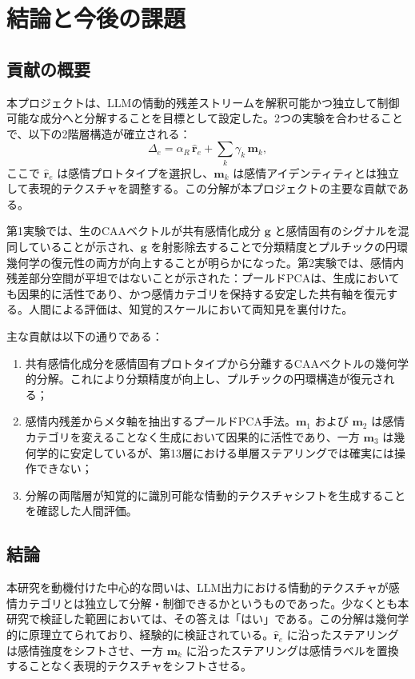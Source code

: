 \chapter{結論と今後の課題}
\label{chap:conclusion}

\section{貢献の概要}

本プロジェクトは、LLMの情動的残差ストリームを解釈可能かつ独立して制御可能な成分へと分解することを目標として設定した。2つの実験を合わせることで、以下の2階層構造が確立される：
\[
\Delta_e = \alpha_R\,\hat{\mathbf{r}}_e + \sum_k \gamma_k\,\mathbf{m}_k,
\]
ここで $\hat{\mathbf{r}}_e$ は感情プロトタイプを選択し、$\mathbf{m}_k$ は感情アイデンティティとは独立して表現的テクスチャを調整する。この分解が本プロジェクトの主要な貢献である。

第1実験では、生のCAAベクトルが共有感情化成分 $\mathbf{g}$ と感情固有のシグナルを混同していることが示され、$\mathbf{g}$ を射影除去することで分類精度とプルチックの円環幾何学の復元性の両方が向上することが明らかになった。第2実験では、感情内残差部分空間が平坦ではないことが示された：プールドPCAは、生成においても因果的に活性であり、かつ感情カテゴリを保持する安定した共有軸を復元する。人間による評価は、知覚的スケールにおいて両知見を裏付けた。

主な貢献は以下の通りである：
\begin{enumerate}
    \item 共有感情化成分を感情固有プロトタイプから分離するCAAベクトルの幾何学的分解。これにより分類精度が向上し、プルチックの円環構造が復元される；
    \item 感情内残差からメタ軸を抽出するプールドPCA手法。$\mathbf{m}_1$ および $\mathbf{m}_2$ は感情カテゴリを変えることなく生成において因果的に活性であり、一方 $\mathbf{m}_3$ は幾何学的に安定しているが、第13層における単層ステアリングでは確実には操作できない；
    \item 分解の両階層が知覚的に識別可能な情動的テクスチャシフトを生成することを確認した人間評価。
\end{enumerate}

\section{結論}

本研究を動機付けた中心的な問いは、LLM出力における情動的テクスチャが感情カテゴリとは独立して分解・制御できるかというものであった。少なくとも本研究で検証した範囲においては、その答えは「はい」である。この分解は幾何学的に原理立てられており、経験的に検証されている。$\hat{\mathbf{r}}_e$ に沿ったステアリングは感情強度をシフトさせ、一方 $\mathbf{m}_k$ に沿ったステアリングは感情ラベルを置換することなく表現的テクスチャをシフトさせる。\par


